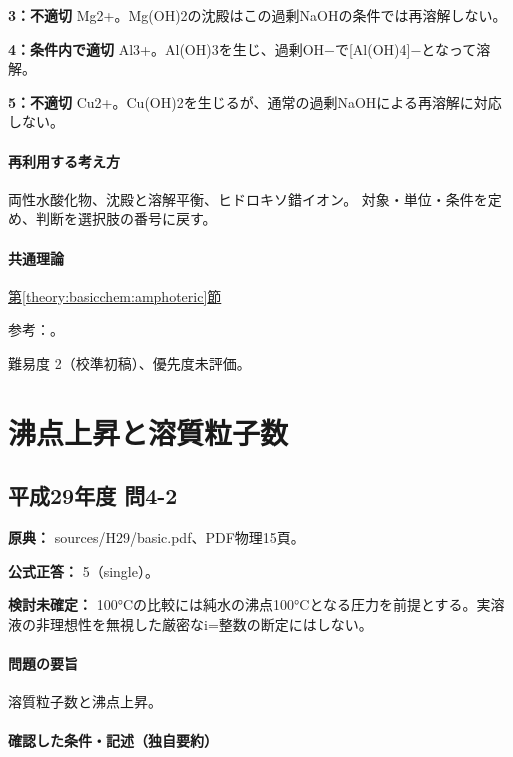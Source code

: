 \noindent\textbf{3：不適切} Mg2+。Mg(OH)2の沈殿はこの過剰NaOHの条件では再溶解しない。\par

\noindent\textbf{4：条件内で適切} Al3+。Al(OH)3を生じ、過剰OH−で[Al(OH)4]−となって溶解。\par

\noindent\textbf{5：不適切} Cu2+。Cu(OH)2を生じるが、通常の過剰NaOHによる再溶解に対応しない。\par

\paragraph{再利用する考え方} 両性水酸化物、沈殿と溶解平衡、ヒドロキソ錯イオン。 対象・単位・条件を定め、判断を選択肢の番号に戻す。

\paragraph{共通理論} \hyperref[theory:basicchem:amphoteric]{第\ref*{theory:basicchem:amphoteric}節}

\par 参考：\cite{chem55_ampho}。

\par 難易度 2（校準初稿）、優先度未評価。

\section{沸点上昇と溶質粒子数}

\subsection{平成29年度 問4-2}
\label{q:h29-reg-basic-4-2}

\noindent\textbf{原典：} sources/H29/basic.pdf、PDF物理15頁。

\textbf{公式正答：} 5（single）。

\par\textbf{検討未確定：} 100°Cの比較には純水の沸点100°Cとなる圧力を前提とする。実溶液の非理想性を無視した厳密なi=整数の断定にはしない。

\paragraph{問題の要旨} 溶質粒子数と沸点上昇。

\paragraph{確認した条件・記述（独自要約）}\mbox{}\par

